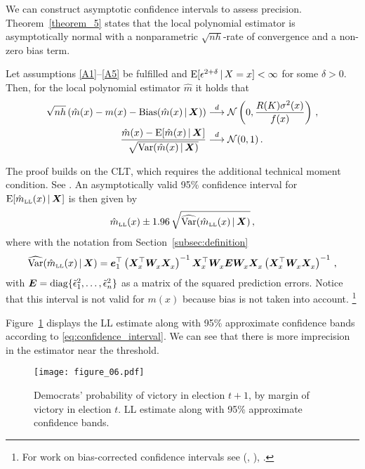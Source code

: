 We can construct asymptotic confidence intervals to assess precision.
Theorem~\ref{theorem_5} states that the local polynomial estimator is asymptotically normal with a nonparametric $\sqrt{nh}$-rate of convergence and a non-zero bias term.
\begin{theorem} \label{theorem_5}
	Let assumptions \ref{A1}--\ref{A5} be fulfilled and $\operatorname{E} [ \epsilon^{2 + \delta} \,|\, X = x ] < \infty$ for some $\delta > 0$.
	Then, for the local polynomial estimator $\hat{m}$ it holds that
	\begin{align}
		\sqrt{nh} \left( \hat{m}(x) - m(x) - \operatorname{Bias}(\hat{m}(x) \,|\, \bm{X}) \right) &\overset{d}{\longrightarrow} \mathcal{N} \left( 0, \frac{R(K) \sigma^2(x)}{f(x)} \right) \,, \\
		\frac{\hat{m}(x) - \operatorname{E}[\hat{m}(x) \,|\, \bm{X}]}{\sqrt{\operatorname{Var}(\hat{m}(x) \,|\, \bm{X})}} &\overset{d}{\longrightarrow} \mathcal{N}(0, 1) \,.
	\end{align}
\end{theorem}
The proof builds on the CLT, which requires the additional technical moment condition.
See \textcite[Section 19.13]{Hansen_2022}.
An asymptotically valid 95\% confidence interval for $\operatorname{E}[\hat{m}_{\textup{\tiny LL}}(x) \,|\, \bm{X}]$ is then given by
\begin{equation}
	\hat{m}_{\textup{\tiny LL}}(x) \pm 1.96 \, \sqrt{\widehat{\operatorname{Var}}(\hat{m}_{\textup{\tiny LL}}(x) \,|\, \bm{X})} \,, \label{eq:confidence_interval}  
\end{equation}
where with the notation from Section~\ref{subsec:definition}
\begin{equation}
	\widehat{\operatorname{Var}}(\hat{m}_{\textup{\tiny LL}}(x) \,|\, \bm{X}) = \bm{e}_1^\top \left( \bm{X}_x^\top \bm{W}_x^{\vphantom{\top}} \bm{X}_x^{\vphantom{\top}} \right)^{-1} \bm{X}_x^\top \bm{W}_x^{\vphantom{\top}} \bm{E} \bm{W}_x^{\vphantom{\top}} \bm{X}_x^{\vphantom{\top}} \left( \bm{X}_x^\top \bm{W}_x^{\vphantom{\top}} \bm{X}_x^{\vphantom{\top}} \right)^{-1} \,,
\end{equation}
with $\bm{E} = \operatorname{diag} \{ \tilde{\epsilon}_1^2, \dots, \tilde{\epsilon}_n^2 \}$ as a matrix of the squared prediction errors.
Notice that this interval is not valid for $m(x)$ because bias is not taken into account.%
\footnote{For work on bias-corrected confidence intervals see
		  \citeauthor{Calonico_2018} (\citeyear{Calonico_2018}, \citeyear{Calonico_2022}), \textcite{Cheng_2019}.} 

Figure~\ref{fig:application_confidence_bands} displays the LL estimate along with 95\% approximate confidence bands according to \eqref{eq:confidence_interval}.
We can see that there is more imprecision in the estimator near the threshold.

\begin{figure}
	\centering
	\texttt{[image: figure\_06.pdf]}
	\caption{Democrats' probability of victory in election $t+1$, by margin of victory in election $t$.
			 LL estimate along with 95\% approximate confidence bands.}
	\label{fig:application_confidence_bands}
\end{figure}